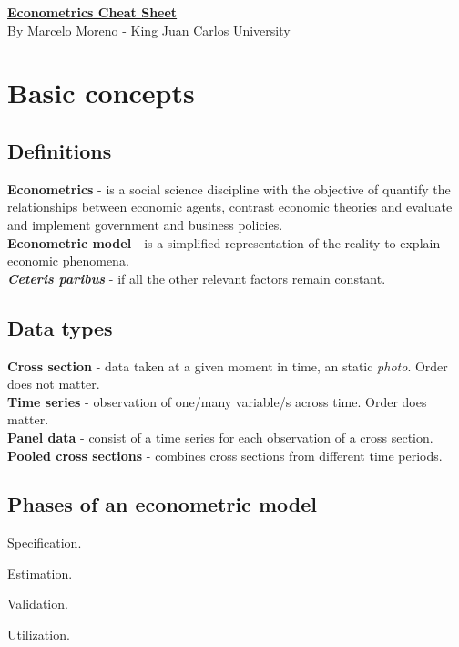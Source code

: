 \documentclass[10pt, a4paper, landscape]{extarticle}
\begin{document}
\setlength{\footskip}{12pt}

\begin{multicols}{3} %

\begin{center}
	\textbf{\LARGE \href{https://github.com/marcelomijas/econometrics-cheatsheet}{Econometrics Cheat Sheet}}
	\\ {\footnotesize By Marcelo Moreno - King Juan Carlos University}
\end{center}

\section*{Basic concepts}
	\subsection*{Definitions}
		\textbf{Econometrics} - is a social science discipline with the objective of quantify the relationships between economic agents, contrast economic theories and evaluate and implement government and business policies.
		\\ \textbf{Econometric model} - is a simplified representation of the reality to explain economic phenomena.
		\\ \textbf{\textsl{Ceteris paribus}} - if all the other relevant factors remain constant.
	\subsection*{Data types}
		\textbf{Cross section} - data taken at a given moment in time, an static \textsl{photo}. Order does not matter.
		\\ \textbf{Time series} - observation of one/many variable/s across time. Order does matter.
		\\ \textbf{Panel data} - consist of a time series for each observation of a cross section.
		\\ \textbf{Pooled cross sections} - combines cross sections from different time periods.
	\subsection*{Phases of an econometric model}
		\begin{enumerate}[leftmargin=*]
			\setlength{\multicolsep}{0pt}
		\end{enumerate}

\end{multicols}
\end{document}
